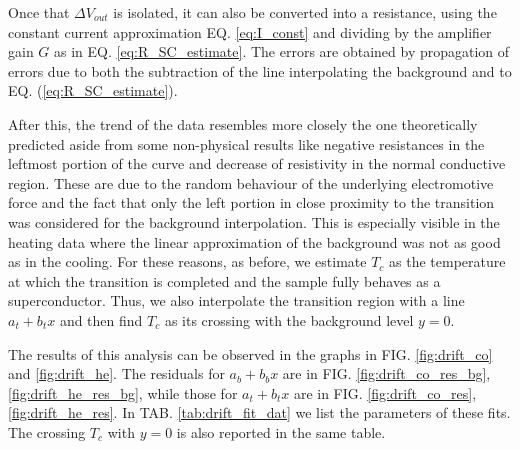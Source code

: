 \documentclass[rmp,10pt,onecolumn,fleqn,notitlepage]{revtex4-1}
\begin{document}
Once that $\Delta V_{out}$ is isolated, it can also be converted into a resistance, using the constant current approximation EQ. \eqref{eq:I_const} and dividing by the amplifier gain $G$ as in EQ. \eqref{eq:R_SC_estimate}. The errors are obtained by propagation of errors due to both the subtraction of the line interpolating the background and to EQ. (\ref{eq:R_SC_estimate}).

After this, the trend of the data resembles more closely the one theoretically predicted aside from some non-physical results like negative resistances in the leftmost portion of the curve and decrease of resistivity in the normal conductive region. These are due to the random behaviour of the underlying electromotive force and the fact that only the left portion in close proximity to the transition was considered for the background interpolation. This is especially visible in the heating data where the linear approximation of the background was not as good as in the cooling. For these reasons, as before, we estimate $T_c$ as the temperature at which the transition is completed and the sample fully behaves as a superconductor.  
Thus, we also interpolate the transition region with a line $a_t + b_t x$ and then find $T_c$ as its crossing with the background level $y=0$.

The results of this analysis can be observed in the graphs in FIG. \ref{fig:drift_co} and \ref{fig:drift_he}.
The residuals for $a_b + b_b x$ are in FIG. \ref{fig:drift_co_res_bg}, \ref{fig:drift_he_res_bg}, while those for $a_t + b_t x$ are in FIG. \ref{fig:drift_co_res}, \ref{fig:drift_he_res}. 
In TAB. \ref{tab:drift_fit_dat} we list the parameters of these fits. The crossing $T_c$ with $y=0$ is also reported in the same table.
\end{document}

